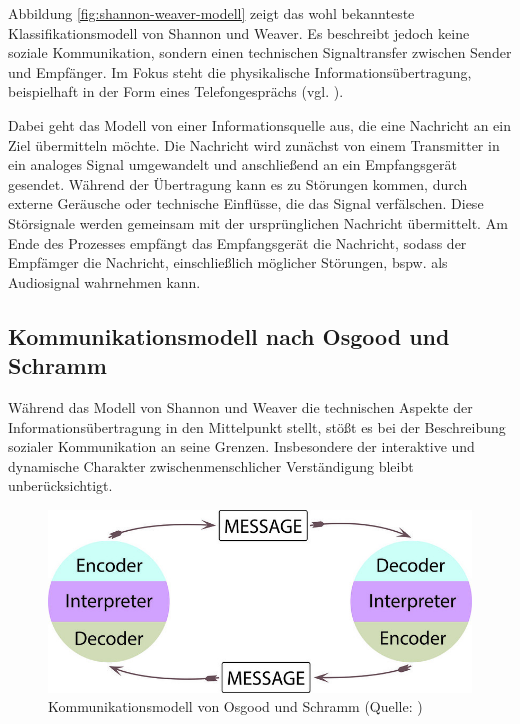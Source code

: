 Abbildung \ref{fig:shannon-weaver-modell} zeigt das wohl bekannteste Klassifikationsmodell von Shannon und Weaver. Es beschreibt jedoch keine soziale Kommunikation, sondern einen technischen Signaltransfer zwischen Sender und Empfänger. Im Fokus steht die physikalische Informationsübertragung, beispielhaft in der Form eines Telefongesprächs (vgl. \citealp[S. 92]{scheufele_kommunikationstheorien_2004}). 

Dabei geht das Modell von einer Informationsquelle aus, die eine Nachricht an ein Ziel übermitteln möchte. Die Nachricht wird zunächst von einem Transmitter in ein analoges Signal umgewandelt und anschließend an ein Empfangsgerät gesendet. Während der Übertragung kann es zu Störungen kommen, durch externe Geräusche oder technische Einflüsse, die das Signal verfälschen. Diese Störsignale werden gemeinsam mit der ursprünglichen Nachricht übermittelt. Am Ende des Prozesses empfängt das Empfangsgerät die Nachricht, sodass der Empfämger die Nachricht, einschließlich möglicher Störungen, bspw. als Audiosignal wahrnehmen kann.

\subsection{Kommunikationsmodell nach Osgood und Schramm}
Während das Modell von Shannon und Weaver die technischen Aspekte der Informationsübertragung in den Mittelpunkt stellt, stößt es bei der Beschreibung sozialer Kommunikation an seine Grenzen. Insbesondere der interaktive und dynamische Charakter zwischenmenschlicher Verständigung bleibt unberücksichtigt.

\begin{figure}[ht]
\centering
\includegraphics[width=1\linewidth]{content/pictures/osgood-schramm.jpg}
\caption{Kommunikationsmodell von Osgood und Schramm (Quelle: \citealp{wrench_24_2021})}
\label{fig:osgood-schramm-modell}
\end{figure}

